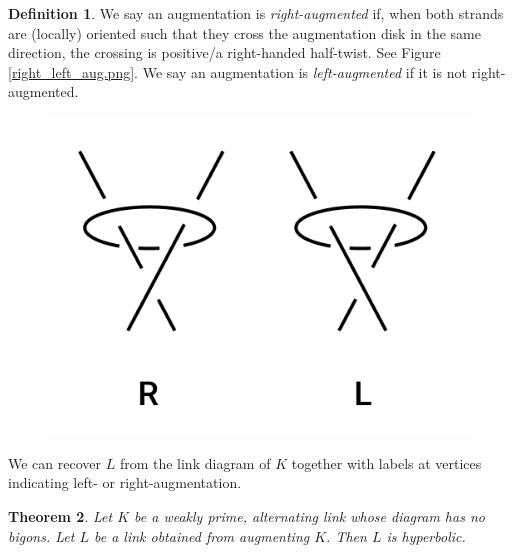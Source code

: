 \documentclass[11pt]{amsart}
\newcommand{\figref}[1]{Figure \ref{#1}}
\theoremstyle{plain}
\newtheorem{theorem}{Theorem}[section]
\theoremstyle{definition}
\newtheorem{define}[theorem]{Definition}
\begin{document}
\begin{define}
We say an augmentation is \emph{right-augmented} if, when both strands are
(locally) oriented such that they cross the augmentation disk in the same
direction, the crossing is positive/a right-handed half-twist.
See \figref{right_left_aug.png}.
We say an augmentation is \emph{left-augmented} if it is not right-augmented.
\begin{figure}
\label{f:right_left_aug}
\includegraphics{more_pictures/right_left_aug.png}
\end{figure}
\end{define}

We can recover $L$ from the link diagram of $K$
together with labels at vertices indicating left- or right-augmentation.




\begin{theorem}
Let $K$ be a weakly prime, alternating link whose diagram has no bigons.
Let $L$ be a link obtained from augmenting $K$.
Then $L$ is hyperbolic.
\end{theorem}
\end{document}

